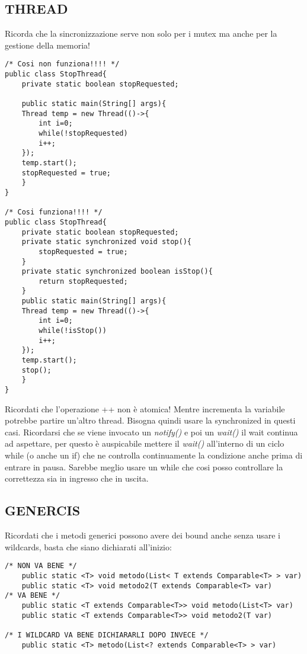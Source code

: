 \subsection{THREAD}
\noindent Ricorda che la sincronizzazione serve non solo per i mutex ma anche per la gestione della memoria!
\begin{lstlisting}
/* Cosi non funziona!!!! */
public class StopThread{
	private static boolean stopRequested;
	
	public static main(String[] args){
	Thread temp = new Thread(()->{
		int i=0;
		while(!stopRequested)
		i++;
	});
	temp.start();
	stopRequested = true;
	}
}

/* Cosi funziona!!!! */
public class StopThread{
	private static boolean stopRequested;
	private static synchronized void stop(){
		stopRequested = true;
	}
	private static synchronized boolean isStop(){
		return stopRequested;
	}	
	public static main(String[] args){
	Thread temp = new Thread(()->{
		int i=0;
		while(!isStop())
		i++;
	});
	temp.start();
	stop();
	}
}
\end{lstlisting}

\noindent Ricordati che l'operazione ++ non è atomica! Mentre incrementa la variabile potrebbe partire un'altro thread. Bisogna quindi usare la synchronized in questi casi. \newline
Ricordarsi che se viene invocato un \textit{notify()} e poi un \textit{wait()} il wait continua ad aspettare, per questo è auspicabile mettere il \textit{wait()} all'interno di un ciclo while (o anche un if) che ne controlla continuamente la condizione anche prima di entrare in pausa. Sarebbe meglio usare un while che cosi posso controllare la correttezza sia in ingresso che in uscita.

\subsection{GENERCIS}
\noindent Ricordati che i metodi generici possono avere dei bound anche senza usare i wildcards, basta che siano dichiarati all'inizio:
\begin{lstlisting}
/* NON VA BENE */
	public static <T> void metodo(List< T extends Comparable<T> > var)
	public static <T> void metodo2(T extends Comparable<T> var)
/* VA BENE */
	public static <T extends Comparable<T>> void metodo(List<T> var)
	public static <T extends Comparable<T>> void metodo2(T var)	
	
/* I WILDCARD VA BENE DICHIARARLI DOPO INVECE */
	public static <T> metodo(List<? extends Comparable<T> > var)
\end{lstlisting}
